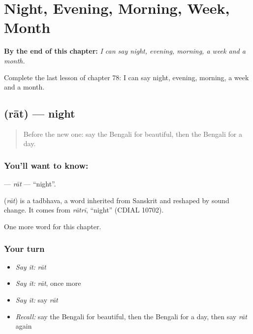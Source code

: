 
\chapter{Night, Evening, Morning, Week, Month}
\label{ch:bn-night-evening-morning-week-month}

\begin{chapteropening}
\textbf{By the end of this chapter:} \emph{I can say night, evening, morning, a week and a month.}

Complete the last lesson of chapter 78: I can say night, evening, morning, a week and a month.
\end{chapteropening}

\section[\texorpdfstring{\bn{রাত} (rāt)}{রাত (rāt)}]{ (rāt) — night}

\label{lesson:BN-C78-rat}



\begin{quote}
Before the new one: say the Bengali for beautiful, then the Bengali for a day.
\end{quote}

\subsection*{You'll want to know: }
\textbf{} — \emph{rāt} — \textquotedblleft{}night\textquotedblright{}.

\begin{cousinweb}
\textbf{} (\emph{rāt}) is a tadbhava, a word inherited from Sanskrit and reshaped by sound change. It comes from \emph{rātrī}, \textquotedblleft{}night\textquotedblright{} (CDIAL 10702).
\end{cousinweb}

\begin{grammarlens}[title={What you've built}]
One more word for this chapter.
\end{grammarlens}

\subsection*{Your turn}
\begin{itemize}
\raggedright
  \item \emph{Say it:} \emph{rāt}
  \item \emph{Say it:} \emph{rāt}, once more
  \item \emph{Say it:} say \emph{rāt}
  \item \emph{Recall:} say the Bengali for beautiful, then the Bengali for a day, then say \emph{rāt} again
\end{itemize}

